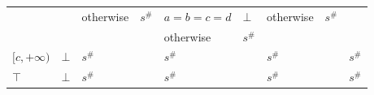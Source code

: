 \documentclass{beamer}
\begin{document}
\begin{frame}
\begin{table}
{\begin{tabular}{|l|l|ll|ll|ll|l|}
                                        &                         & \multirow{2}{*}{otherwise}   & \multirow{2}{*}{$s^\#$}                             & $a = b = c = d$           & $\bot$                       & \multirow{2}{*}{otherwise}   & \multirow{2}{*}{$s^\#$}                             &                         \\
                                        &                         &                              &                                                     & otherwise                 & $s^\#$     &                              &                                                     &                         \\ \hline
        \multirow{3}{*}{$[c, +\infty)$} & \multirow{3}{*}{$\bot$} & \multicolumn{2}{l|}{\multirow{3}{*}{$s^\#$}}                                       & \multicolumn{2}{l|}{\multirow{3}{*}{$s^\#$}}             & \multicolumn{2}{l|}{\multirow{3}{*}{$s^\#$}}                                       & \multirow{3}{*}{$s^\#$} \\
                                        &                         & \multicolumn{2}{l|}{}                                                              & \multicolumn{2}{l|}{}                                    & \multicolumn{2}{l|}{}                                                              &                         \\
                                        &                         & \multicolumn{2}{l|}{}                                                              & \multicolumn{2}{l|}{}                                    & \multicolumn{2}{l|}{}                                                              &                         \\ \hline
        $\top$                          & $\bot$                  & \multicolumn{2}{l|}{$s^\#$}                                                        & \multicolumn{2}{l|}{$s^\#$}                              & \multicolumn{2}{l|}{$s^\#$}                                                        & $s^\#$                  \\ \hline
        \end{tabular}
        }
        \end{table}
    \end{frame}
    
\end{document}

